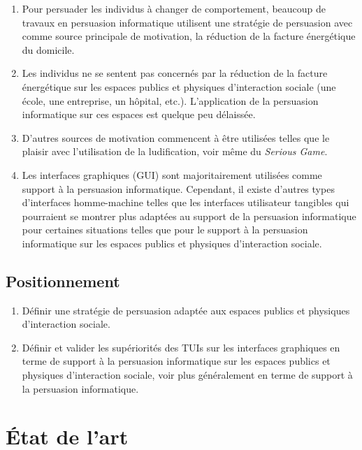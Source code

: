 \documentclass[10pt,a5paper,twoside]{article}
\begin{document}
\begin{enumerate}
\def\labelenumi{\arabic{enumi}.}
\itemsep1pt\parskip0pt
\item
  Pour persuader les individus à changer de comportement, beaucoup de
  travaux en persuasion informatique utilisent une stratégie de
  persuasion avec comme source principale de motivation, la réduction de
  la facture énergétique du domicile.
\item
  Les individus ne se sentent pas concernés par la réduction de la
  facture énergétique sur les espaces publics et physiques d'interaction
  sociale (une école, une entreprise, un hôpital, etc.). L'application
  de la persuasion informatique sur ces espaces est quelque peu
  délaissée.
\item
  D'autres sources de motivation commencent à être utilisées telles que
  le plaisir avec l'utilisation de la ludification, voir même du
  \emph{Serious Game}.
\item
  Les interfaces graphiques (GUI) sont majoritairement utilisées comme
  support à la persuasion informatique. Cependant, il existe d'autres
  types d'interfaces homme-machine telles que les interfaces utilisateur
  tangibles qui pourraient se montrer plus adaptées au support de la
  persuasion informatique pour certaines situations telles que pour le
  support à la persuasion informatique sur les espaces publics et
  physiques d'interaction sociale.
\end{enumerate}

\subsection{Positionnement}\label{positionnement}

\begin{enumerate}
\def\labelenumi{\arabic{enumi}.}
\itemsep1pt\parskip0pt
\item
  Définir une stratégie de persuasion adaptée aux espaces publics et
  physiques d'interaction sociale.
\item
  Définir et valider les supériorités des TUIs sur les interfaces
  graphiques en terme de support à la persuasion informatique sur les
  espaces publics et physiques d'interaction sociale, voir plus
  généralement en terme de support à la persuasion informatique.
\end{enumerate}

\section{État de l'art}\label{uxe9tat-de-lart}
\end{document}
